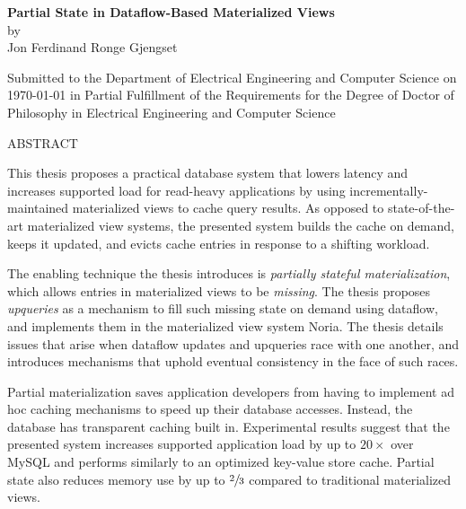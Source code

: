 \documentclass[fontsize=12pt,paper=letter]{scrartcl}
\begin{document}
\begin{titlepage}
  \begin{center}
    \textbf{\large Partial State in Dataflow-Based Materialized Views}\\
    \vspace{0.3\baselineskip}
    by\\
    \vspace{0.3\baselineskip}
    {\large Jon Ferdinand Ronge Gjengset}\\
    \vspace{0.4\baselineskip}
    \begin{addmargin}[0.5in]{0.5in}
      \centering
      Submitted to the Department of Electrical Engineering and Computer Science
      on \today{} in Partial Fulfillment of the Requirements for the Degree of
      Doctor of Philosophy in Electrical Engineering and Computer Science
    \end{addmargin}
  \end{center}

  \begin{flushleft}
  ABSTRACT
  \vspace{0.5\baselineskip}

  This thesis proposes a practical database system that lowers latency and
    increases supported load for read-heavy applications by using
    incrementally-maintained materialized views to cache query results. As
    opposed to state-of-the-art materialized view systems, the presented system
    builds the cache on demand, keeps it updated, and evicts cache entries in
    response to a shifting workload.

  \vspace{0.2\baselineskip}

  The enabling technique the thesis introduces is \textit{partially stateful
    materialization}, which allows entries in materialized views to be
    \textit{missing}. The thesis proposes \textit{upqueries} as a mechanism to
    fill such missing state on demand using dataflow, and implements them in the
    materialized view system Noria. The thesis details issues that arise when
    dataflow updates and upqueries race with one another, and introduces
    mechanisms that uphold eventual consistency in the face of such races.

  \vspace{0.2\baselineskip}

  Partial materialization saves application developers from having to implement
    ad hoc caching mechanisms to speed up their database accesses. Instead, the
    database has transparent caching built in. Experimental results suggest that
    the presented system increases supported application load by up to
    $20\times$ over MySQL and performs similarly to an optimized key-value store
    cache. Partial state also reduces memory use by up to $\sfrac{2}{3}$
    compared to traditional materialized views.


\end{flushleft}
\end{titlepage}
\end{document}
